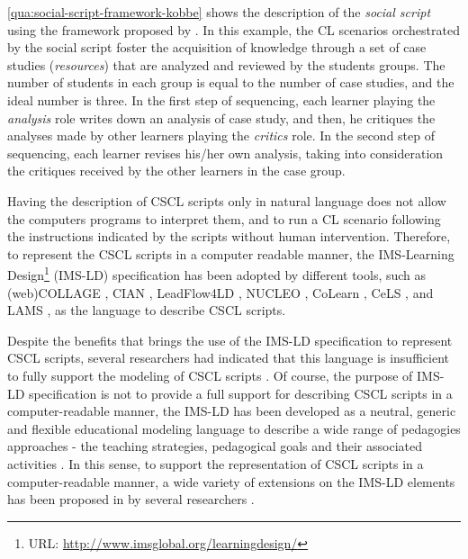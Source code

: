 \autoref{qua:social-script-framework-kobbe} shows the description of the \emph{social script} \cite{WeinbergerErtlFischerMandl2005} using the framework proposed by . In this example, the CL scenarios orchestrated by the social script foster the acquisition of knowledge through a set of case studies (\emph{resources}) that are analyzed and reviewed by the students groups. The number of students in each group is equal to the number of case studies, and the ideal number is three. In the first step of sequencing, each learner playing the \emph{analysis} role writes down an analysis of case study, and then, he critiques the analyses made by other learners playing the \emph{critics} role. In the second step of sequencing, each learner revises his/her own analysis, taking into consideration the critiques received by the other learners in the case group.

Having the description of CSCL scripts only in natural language does not allow the computers programs to interpret them, and to run a CL scenario following the instructions indicated by the scripts without human intervention. Therefore, to represent the CSCL scripts in a computer readable manner, the IMS-Learning Design\footnote{URL: \url{http://www.imsglobal.org/learningdesign/}} (IMS-LD) specification has been adopted by different tools, such as (web)COLLAGE \cite{Hernandez-LeoVillasclaras-FernandezAsensio-PerezDimitriadisJorrin-AbellanRuiz-RequiesRubia-Avi2006,Villasclaras-FernandezHernandez-LeoAsensio-PerezDimitriadis2013}, CIAN \cite{MolinaRedondoOrtega2012}, LeadFlow4LD \cite{Palomino-RamirezBote-LorenzoAsensio-PerezDimitriadis2008}, NUCLEO \cite{SanchoFuentes-FernandezFernandez-Manjon2008}, CoLearn \cite{StylianakisArapiMoumoutzisChristodoulakis2013}, CeLS \cite{RonenKohen-Vacs2009}, and LAMS \cite{Romero-MorenoOrtegaTroyano2007}, as the language to describe CSCL scripts.
 
Despite the benefits that brings the use of the IMS-LD specification to represent CSCL scripts, several researchers had indicated that this language is insufficient to fully support the modeling of CSCL scripts \cite{AlharbiAthaudaChiong2014, CaeiroAnidoLlamas2003}. Of course, the purpose of IMS-LD specification is not to provide a full support for describing CSCL scripts in a computer-readable manner, the IMS-LD has been developed as a neutral, generic and flexible educational modeling language to describe a wide range of pedagogies approaches - the teaching strategies, pedagogical goals and their associated activities \cite{Koper2005}. In this sense, to support the representation of CSCL scripts in a computer-readable manner, a wide variety of extensions on the IMS-LD elements has been proposed in by several researchers \cite{Bote-LorenzoVaquero-GonzalezVega-GorgojoDimitriadisAsensio-PerezGomez-SanchezHernandez-Leo2004, LeoPerezDimitriadis2004, MagnisalisDemetriadis2012, MiaoHoeksemaHoppeHarrer2005, Vega-GorgojoBote-LorenzoGomez-SanchezDimitriadisAsensio-Perez2005}.

